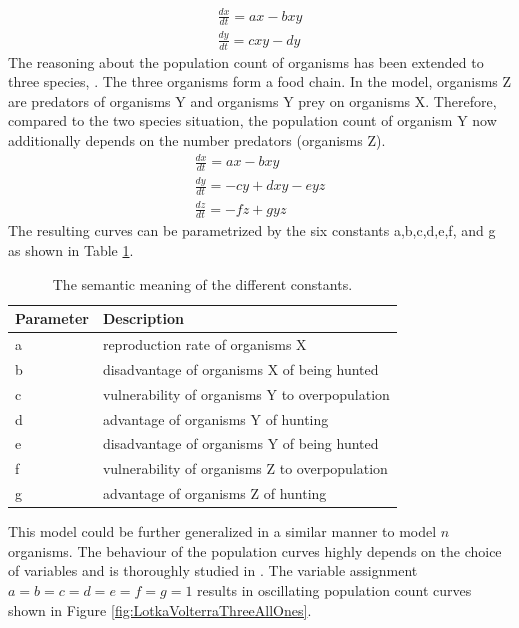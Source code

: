 \documentclass[11pt]{article}
\begin{document}
\begin{equation}
\begin{split}
\frac{dx}{dt} = ax-bxy \\ 
\frac{dy}{dt} = cxy-dy
\end{split}
\end{equation}
The reasoning about the population count of organisms has been extended to three species, \cite{lotkaVolterraThreeSpecies}. The three organisms form a food chain. In the model, organisms Z are predators of organisms Y and organisms Y prey on organisms X. Therefore, compared to the two species situation, the population count of organism Y now additionally depends on the number predators (organisms Z).
\begin{equation}
\begin{split}
\frac{dx}{dt} = ax-bxy \\ 
\frac{dy}{dt} = -cy+dxy-eyz \\ 
\frac{dz}{dt} = -fz+gyz
\end{split}
\end{equation}
The resulting curves can be parametrized by the six constants a,b,c,d,e,f, and g as shown in Table \ref{tab:LotkaVolterraParameters}.
\begin{table}[htbp]
\centering
\begin{tabular}{l|l}
Parameter & Description \\ 
\hline 
\hline 
a & reproduction rate of organisms X\\ 
\hline 
b & disadvantage of organisms X of being hunted\\ 
\hline 
c & vulnerability of organisms Y to overpopulation\\  
\hline 
d & advantage of organisms Y of hunting\\
\hline 
e & disadvantage of organisms Y of being hunted\\
\hline 
f & vulnerability of organisms Z to overpopulation\\
\hline 
g & advantage of organisms Z of hunting\\
\end{tabular}
\caption{The semantic meaning of the different constants.}
\label{tab:LotkaVolterraParameters}
\end{table}
This model could be further generalized in a similar manner to model $n$ organisms. The behaviour of the population curves highly depends on the choice of variables and is thoroughly studied in \cite{lotkaVolterraThreeSpecies}. The variable assignment $a=b=c=d=e=f=g=1$ results in oscillating population count curves shown in Figure \ref{fig:LotkaVolterraThreeAllOnes}. 
\end{document}
